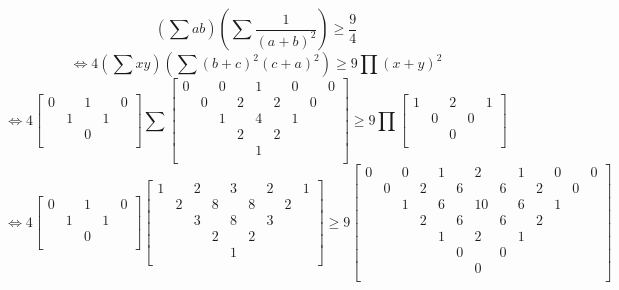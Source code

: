 \documentclass[UTF8]{ctexart}
\begin{document}
$$ (\displaystyle \sum ab)(\displaystyle \sum \dfrac{1}{(a+b)^{2}})\geq \dfrac{9}{4}$$
$$\Leftrightarrow 
4(\displaystyle \sum xy)(\displaystyle \sum (b+c)^{2}(c+a)^{2})\geq 9\prod (x+y)^{2}$$
$$\Leftrightarrow 
4\left[
\begin{smallmatrix}
	0& &1& &0\\
	&1& &1&\\
	& &0& &\\
\end{smallmatrix}
\right]
\displaystyle \sum \left[
\begin{smallmatrix}
	0& &0& &1& &0& &0\\
	&0& &2& &2& &0&\\
	& &1& &4& &1& &\\
	& & &2& &2& & &\\
	& & & &1& & & &\\
\end{smallmatrix}
\right]\geq 9\prod 
\left[
\begin{smallmatrix}
	1& &2& &1\\
	&0& &0&\\
	& &0& &\\
\end{smallmatrix}
\right]
$$
$$\Leftrightarrow 
4\left[
\begin{smallmatrix}
	0& &1& &0\\
	&1& &1&\\
	& &0& &\\
\end{smallmatrix}
\right]
\left[
\begin{smallmatrix}
	1& &2& &3& &2& &1\\
	&2& &8& &8& &2&\\
	& &3& &8& &3& &\\
	& & &2& &2& & &\\
	& & & &1& & & &\\
\end{smallmatrix}
\right]\geq 9
\left[
\begin{smallmatrix}
	0& &0& &1& &2& &1& &0& &0\\
	&0& &2& &6& &6& &2& &0&\\
	& &1& &6& &10& &6& &1& &\\
	& & &2& &6& &6& &2& & &\\
	& & & &1& &2& &1& & & &\\
	& & & & &0& &0& & & & &\\
	& & & & & &0& & & & & &\\
\end{smallmatrix}
\right]$$
\end{document}
